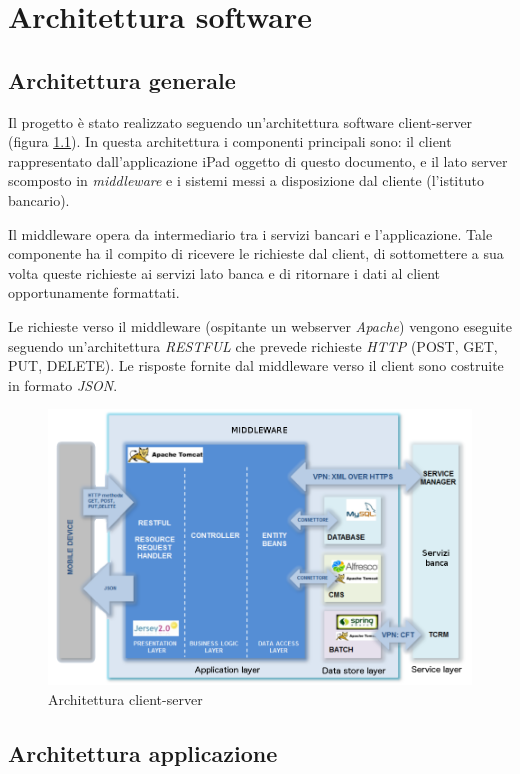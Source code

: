\chapter{Architettura software}


\section{Architettura generale}

Il progetto è stato realizzato seguendo un'architettura software client-server (figura \ref{fig:arch}). In questa architettura i componenti principali sono: il client rappresentato dall'applicazione iPad oggetto di questo documento, e il lato server scomposto in \emph{middleware} e i sistemi messi a disposizione dal cliente (l'istituto bancario).

Il middleware opera da intermediario tra i servizi bancari e l'applicazione. Tale componente ha il compito di ricevere le richieste dal client, di sottomettere a sua volta queste richieste ai servizi lato banca e di ritornare i dati al client opportunamente formattati.

Le richieste verso il middleware (ospitante un webserver \emph{Apache}) vengono eseguite seguendo un'architettura \emph{RESTFUL}  che prevede richieste \emph{HTTP} (POST, GET, PUT, DELETE). Le risposte fornite dal middleware verso il client sono costruite in formato \emph{JSON}.


\begin{figure}[!htbp]
\centering
\includegraphics[scale=0.60]{architettura/architect.png}
\caption{Architettura client-server}
\label{fig:arch}
\end{figure}


\section{Architettura applicazione}

